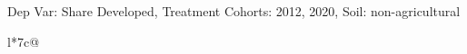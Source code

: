 \begin{table}[H]
\captionlistentry[table]{}
\label{table:beaver_land_class_DVis_land_class_3_SCg13_SSNAG}
\scriptsize %
Dep Var: Share Developed, Treatment Cohorts: 2012, 2020, Soil: non-agricultural \\
\begin{threeparttable}
\begin{tabulary}{\textwidth}{l*{7}{c}@{}}
\toprule \toprule
\noalign{\smallskip}
\noalign{\smallskip}
\midrule \bottomrule
\end{tabulary}
\medskip
\end{threeparttable}
\end{table}
